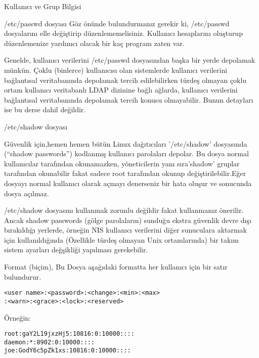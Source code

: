 \begin{section}{Kullanıcı ve Grup Bilgisi}
\begin{subsection}{/etc/passwd dosyası}
Göz önünde bulundurmanız gerekir ki, /etc/passwd dosyalarını elle değiştirip düzenlememelisiniz. Kullanıcı hesaplarını oluşturup düzenlemenize yardımcı olacak bir kaç program zaten var.

Genelde, kullanıcı verilerini /etc/passwd dosyasından başka bir yerde depolamak münkün. Çoklu (binlerce) kullanıcısı olan sistemlerde kullanıcı verilerini bağlantısal veritabanında depolamak tercih edilebilirken türdeş olmayan çoklu ortam kullanıcı veritabanlı LDAP dizinine bağlı ağlarda, kullanıcı verilerini bağlantısal veritabanında depolamak tercih konusu olmayabilir. Bunun detayları ise bu derse dahil değildir.
\end{subsection}
\begin{subsection}{/etc/shadow dosyası}

Güvenlik için,hemen hemen bütün Linux dağıtıcıları '/etc/shadow' dosyasında (“shadow passwords”) kodlanmış kullanıcı parolaları depolar. Bu dosya normal kullanıcılar tarafından okunamazken, yöneticilerin yanı sıra'shadow' gruplar tarafından okunabilir fakat sadece root tarafından okunup değiştirilebilir.Eğer dosyayı normal kullanıcı olarak açmayı denerseniz bir hata oluşur ve sonucunda dosya açılmaz.

/etc/shadow dosyasını kullanmak zorunlu değildir fakat kullanmanız önerilir. Ancak shadow passwords (gölge parolaların) sunduğu ekstra güvenlik devre dışı bırakıldığı yerlerde, örneğin NIS kullanıcı verilerini diğer sunuculara aktarmak için kullanıldığında (Özellikle türdeş olmayan Unix ortamlarında) bir takım sistem ayarları değşikliği yapılması gerekebilir.

Format (biçim), Bu Dosya aşağıdaki formatta her kullanıcı için bir satır bulundurur.
\begin{verbatim}
<user name>:<password>:<change>:<min>:<max>
:<warn>:<grace>:<lock>:<reserved>
\end{verbatim}

Örneğin:
\begin{verbatim}
root:gaY2L19jxzHj5:10816:0:10000::::
daemon:*:8902:0:10000::::
joe:GodY6c5pZk1xs:10816:0:10000::::
\end{verbatim}


\end{subsection}
\end{section}
